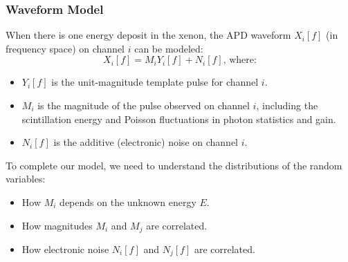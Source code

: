 \documentclass{beamer}
\begin{document}
\begin{frame}
\begin{center}
{}\end{center}
\end{frame}

\begin{frame}
\begin{center}
\frametitle{Waveform Model}
\end{center}
\vspace{0.5cm}
When there is one energy deposit in the xenon, the APD waveform $X_i[f]$ (in frequency space) on channel $i$ can be modeled:
\[X_i[f] = M_i Y_i[f] + N_i[f]\text{, where:}\]
\begin{itemize}
\item $Y_i[f]$ is the unit-magnitude template pulse for channel $i$.
\item $M_i$ is the magnitude of the pulse observed on channel $i$, including the scintillation energy and Poisson fluctuations in photon statistics and gain.
\item $N_i[f]$ is the additive (electronic) noise on channel $i$.\\[\baselineskip]
\end{itemize}

To complete our model, we need to understand the distributions of the random variables:
\begin{itemize}
\item How $M_i$ depends on the unknown energy $E$.
\item How magnitudes $M_i$ and $M_j$ are correlated.
\item How electronic noise $N_i[f]$ and $N_j[f]$ are correlated.
\end{itemize}
\end{frame}
\end{document}
